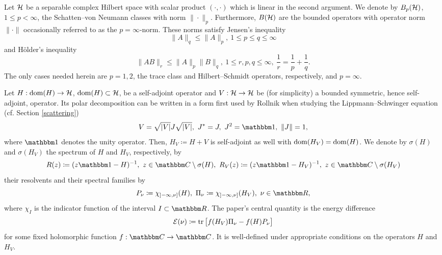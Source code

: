 Let ${\mathcal H}$ be a separable complex Hilbert space with scalar product $(\cdot,\cdot)$ which is linear in the second argument. 
We denote by $B_p({\mathcal H})$, $1\leq p<\infty$, the Schatten--von Neumann classes with norm $\|\cdot\|_p$.
Furthermore, $B({\mathcal H})$ are the bounded operators with operator norm $\|\cdot\|$ occasionally referred to as the $p=\infty$-norm.
These norms satisfy Jensen's inequality
\begin{equation}\label{jensen_inequality}
   \| A\|_q \leq \|A\|_p,\ 1\leq p\leq q\leq \infty
\end{equation}
and H\"older's inequality
\begin{equation}\label{hoelder_inequality}
   \|A B\|_r \leq \|A\|_p\|B\|_q,\ 1\leq r,p,q\leq \infty,\
   \frac{1}{r} = \frac{1}{p}+\frac{1}{q} .
\end{equation}
The only cases needed herein are $p=1,2$, the trace class and Hilbert--Schmidt operators, respectively, 
and $p=\infty$.

Let $H:\operatorname{dom}(H)\to{\mathcal H}$, $\operatorname{dom}(H)\subset{\mathcal H}$, be a self-adjoint operator
and $V:{\mathcal H}\to{\mathcal H}$ be (for simplicity) a bounded symmetric, hence self-adjoint, operator. Its polar decomposition
can be written in a form first used by Rollnik \cite{Rollnik1956} when studying the Lippmann--Schwinger equation (cf. Section \ref{scattering})
\begin{equation}\label{V_polar_decomposition}
  V = \sqrt{|V|}J\sqrt{|V|},\ J^*=J,\ J^2=\id,\ \|J\|=1 ,
\end{equation}
where $\id$ denotes the unity operator. Then, $H_V\coloneqq H+V$ is self-adjoint as well with $\operatorname{dom}(H_V)=\operatorname{dom}(H)$. 
We denote by $\sigma(H)$ and $\sigma(H_V)$ the spectrum of $H$ and $H_V$, respectively, by
\begin{equation}\label{resolvents}
  R(z) \coloneqq (z\id-H)^{-1},\ z\in\C\setminus\sigma(H),\ 
  R_V(z) \coloneqq (z\id- H_V)^{-1},\ z\in\C\setminus\sigma(H_V)
\end{equation}
their resolvents and their spectral families by
\begin{equation}\label{spectral_projections}
  P_\nu \coloneqq \chi_{\interval[open left]{-\infty}{\nu}}(H),\   
  \Pi_\nu \coloneqq \chi_{\interval[open left]{-\infty}{\nu}}(H_V),\ \nu\in\R ,
\end{equation}
where $\chi_I$ is the indicator function of the interval $I\subset\R$.
The paper's central quantity is the energy difference
\begin{equation}\label{energy_difference}
  \mathcal{E}(\nu) \coloneqq \operatorname{tr} \big[f(H_V)\Pi_\nu - f(H)P_\nu\big]
\end{equation}
for some fixed holomorphic function $f:\C\to\C$.
It is well-defined under appropriate conditions on the operators $H$ and $H_V$.
